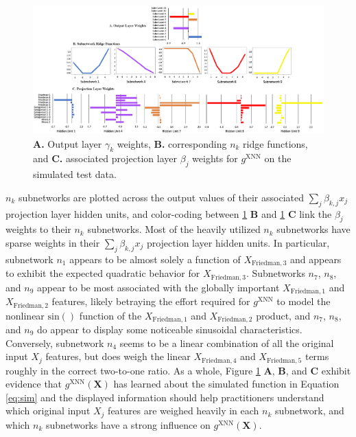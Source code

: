 \documentclass[information,article,submit,moreauthors,pdftex]{definitions/mdpi}
\begin{document}
\begin{figure}[H]
	\hskip-20pt\includegraphics[width=18cm]{img/sim_xnn_glob_ridge.png}
	\caption{\textbf{A.} Output layer $\gamma_k$ weights, \textbf{B.} corresponding $n_k$ ridge functions, and \textbf{C.} associated projection layer $\beta_j$ weights for $g^\text{XNN}$ on the simulated test data.}
	\label{fig:sim_xnn_glob_ridge}
\end{figure}   


\noindent $n_k$ subnetworks are plotted across the output values of their associated $\sum_j\beta_{k,j}x_j$ projection layer hidden units, and color-coding between \ref{fig:sim_xnn_glob_ridge} \textbf{B} and \ref{fig:sim_xnn_glob_ridge} \textbf{C} link the $\beta_j$ weights to their $n_k$ subnetworks. Most of the heavily utilized $n_k$ subnetworks have sparse weights in their $\sum_j\beta_{k,j}x_j$ projection layer hidden units. In particular, subnetwork $n_1$ appears to be almost solely a function of $X_{\text{Friedman}, 3}$ and appears to exhibit the expected quadratic behavior for $X_{\text{Friedman}, 3}$.  Subnetworks $n_7$, $n_8$, and $n_9$ appear to be most associated with the globally important $X_{\text{Friedman}, 1}$ and $X_{\text{Friedman}, 2}$ features, likely betraying the effort required for $g^{\text{XNN}}$ to model the nonlinear $\text{sin}()$ function of the $X_{\text{Friedman}, 1}$ and $X_{\text{Friedman}, 2}$ product, and $n_7$, $n_8$, and $n_9$ do appear to display some noticeable sinusoidal characteristics.  Conversely, subnetwork $n_4$ seems to be a linear combination of all the original input $X_j$ features, but does weigh the linear $X_{\text{Friedman},4}$ and $X_{\text{Friedman},5}$ terms roughly in the correct two-to-one ratio. As a whole, Figure \ref{fig:sim_xnn_glob_ridge} \textbf{A}, \textbf{B}, and \textbf{C} exhibit evidence that $g^\text{XNN}(\mathbf{X})$ has learned about the simulated function in Equation \ref{eq:sim} and the displayed information should help practitioners understand which original input $X_j$ features are weighed heavily in each $n_k$ subnetwork, and which $n_k$ subnetworks have a strong influence on $g^\text{XNN}(\mathbf{X})$. 
\end{document}
